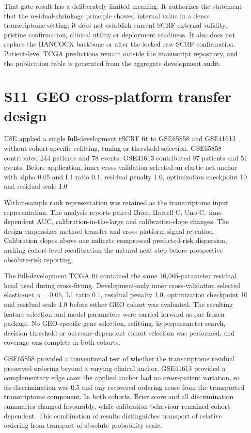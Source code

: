 \documentclass[pdflatex,sn-nature]{sn-jnl}
\begin{document}
That gate result has a deliberately limited meaning. It authorizes the statement that the residual-shrinkage principle showed internal value in a dense transcriptome setting; it does not establish current-SCRF external validity, pristine confirmation, clinical utility or deployment readiness. It also does not replace the HANCOCK backbone or alter the locked raw-SCRF confirmation. Patient-level TCGA predictions remain outside the manuscript repository, and the publication table is generated from the aggregate development audit.

\section*{S11~GEO cross-platform transfer design}
U8E applied a single full-development tSCRF fit to GSE65858 and GSE41613 without cohort-specific refitting, tuning or threshold selection. GSE65858 contributed 244 patients and 78 events; GSE41613 contributed 97 patients and 51 events. Before application, inner cross-validation selected an elastic-net anchor with alpha 0.05 and L1 ratio 0.1, residual penalty 1.0, optimization checkpoint 10 and residual scale 1.0.

Within-sample rank representation was retained as the transcriptome input representation. The analysis reports paired Brier, Harrell C, Uno C, time-dependent AUC, calibration-in-the-large and calibration-slope changes. The design emphasizes method transfer and cross-platform signal retention. Calibration slopes above one indicate compressed predicted-risk dispersion, making cohort-level recalibration the natural next step before prospective absolute-risk reporting.

The full-development TCGA fit contained the same 16,065-parameter residual head used during cross-fitting. Development-only inner cross-validation selected elastic-net $\alpha=0.05$, L1 ratio 0.1, residual penalty 1.0, optimization checkpoint 10 and residual scale 1.0 before either GEO cohort was evaluated. The resulting feature-selection and model parameters were carried forward as one frozen package. No GEO-specific gene selection, refitting, hyperparameter search, decision threshold or outcome-dependent cohort selection was performed, and coverage was complete in both cohorts.

GSE65858 provided a conventional test of whether the transcriptome residual preserved ordering beyond a varying clinical anchor. GSE41613 provided a complementary edge case: the applied anchor had no cross-patient variation, so its discrimination was 0.5 and any recovered ordering arose from the transported transcriptome component. In both cohorts, Brier score and all discrimination summaries changed favourably, while calibration behaviour remained cohort dependent. This combination of results distinguishes transport of relative ordering from transport of absolute probability scale.
\end{document}
